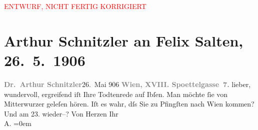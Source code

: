 
\begin{center}
            \textcolor{red}{ENTWURF, NICHT FERTIG KORRIGIERT}
                      \end{center}
            
         
         \renewcommand{\erwaehntePersonen}{Personen: Henrik Ibsen, Friedrich Mitterwurzer, Felix Salten}
         \renewcommand{\erwaehnteOrte}{Orte: Berlin, Wien}
         \renewcommand{\erwaehnteWerke}{Werke: ?? [Totenrede an Ibsen]}
               \section[Arthur Schnitzler an Felix Salten, 26. 5. 1906]{ Arthur Schnitzler an Felix Salten, 26. 5. 1906}\nopagebreak{}\rehead{ }\begin{ledgroupsized}[t]{13cm}\normalsize\beginnumbering \toendnotes[C]{\smallbreak\pagebreak[2]} 
\toendnotes[C]{\smallbreak}\pstart
           \noindent{}{\pb}\textcolor{gray}{\textbf{Dr. Arthur Schnitzler}}\hfill 26. Mai 906\pend
           \pstart
           \textcolor{gray}{\textbf{Wien, XVIII.
                        Spoettelgasse 7.}}\pend
           \pstart
           lieber, wundervoll, ergreifend iſt Ihre Todtenrede auf Ibſen. Man möchte ſie von Mitterwurzer geleſen
               hören. \pend
           \pstart
           {\pb}Iſt es wahr, dſs Sie zu
                  Pfingſten nach Wien kommen? Und am
                  23. wieder–? \pend
           \pstart
           Von Herzen Ihr {\\[\baselineskip]}\spacefill\mbox{A.}\pend
           \leftskip=0em{}
         
         \endnumbering{}\end{ledgroupsized}\begin{anhang}\end{anhang}\newcommand{\dateiname}{L03006}\newcommand{\titel}{Arthur Schnitzler an Felix Salten, 26. 5. 1906}\newcommand{\editorInnen}{Martin Anton Müller und Laura Untner}
      